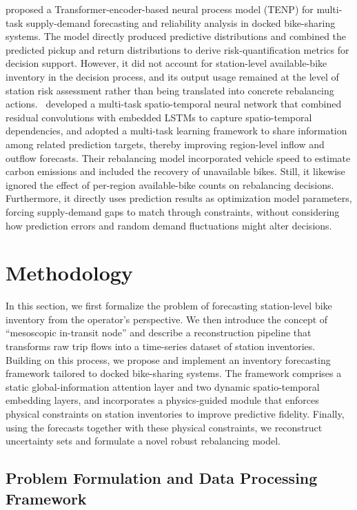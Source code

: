 \documentclass[preprint,12pt,authoryear]{elsarticle}
\begin{document}
\cite{xu2023multi} proposed a Transformer-encoder-based neural process model (TENP) for multi-task supply-demand forecasting and reliability analysis in docked bike-sharing systems. The model directly produced predictive distributions and combined the predicted pickup and return distributions to derive risk-quantification metrics for decision support. However, it did not account for station-level available-bike inventory in the decision process, and its output usage remained at the level of station risk assessment rather than being translated into concrete rebalancing actions.~\cite{chang2023smart} developed a multi-task spatio-temporal neural network that combined residual convolutions with embedded LSTMs to capture spatio-temporal dependencies, and adopted a multi-task learning framework to share information among related prediction targets, thereby improving region-level inflow and outflow forecasts. Their rebalancing model incorporated vehicle speed to estimate carbon emissions and included the recovery of unavailable bikes. Still, it likewise ignored the effect of per-region available-bike counts on rebalancing decisions. Furthermore, it directly uses prediction results as optimization model parameters, forcing supply-demand gaps to match through constraints, without considering how prediction errors and random demand fluctuations might alter decisions.


\section{Methodology}

In this section, we first formalize the problem of forecasting station-level bike inventory from the operator's perspective. We then introduce the concept of ``mesoscopic in-transit node'' and describe a reconstruction pipeline that transforms raw trip flows into a time-series dataset of station inventories. Building on this process, we propose and implement an inventory forecasting framework tailored to docked bike-sharing systems. The framework comprises a static global-information attention layer and two dynamic spatio-temporal embedding layers, and incorporates a physics-guided module that enforces physical constraints on station inventories to improve predictive fidelity. Finally, using the forecasts together with these physical constraints, we reconstruct uncertainty sets and formulate a novel robust rebalancing model. 

\subsection{Problem Formulation and Data Processing Framework}
\end{document}
